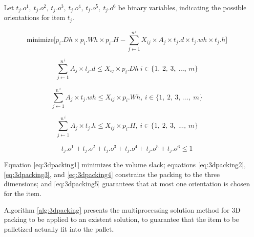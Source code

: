 \documentclass[preprint,authoryear]{elsarticle}
\begin{document}
Let $t_j.o^1,\ t_j.o^2,\ t_j.o^3,\ t_j.o^4,\ t_j.o^5,\ t_j.o^6$ be binary variables, indicating the possible orientations for item $t_j$.


\begin{equation} \label{eq:3dpacking1}
	\mbox{minimize} \Big [ p_i.Dh \times p_i.Wh \times p_i.H - \sum_{j \gets 1}^{n^{\ i}} X_{ij} \times A_{j} \times t_j.d \times t_j.wh \times t_j.h \Big ]
\end{equation}

\begin{equation} \label{eq:3dpacking2}
	\sum_{j \gets 1}^{n^{\ i}} A_{j} \times t_j.d  \leq X_{ij} \times p_i.Dh\ i \in \{1,\ 2,\ 3,\ ...,\ m\}
\end{equation}

\begin{equation} \label{eq:3dpacking3}
	\sum_{j \gets 1}^{n^{\ i}} A_{j} \times t_j.wh  \leq X_{ij} \times p_i.Wh,\ i \in \{1,\ 2,\ 3,\ ...,\ m\}
\end{equation}

\begin{equation} \label{eq:3dpacking4}
	\sum_{j \gets 1}^{n^{\ i}} A_{j} \times t_j.h  \leq X_{ij} \times p_i.H,\ i \in \{1,\ 2,\ 3,\ ...,\ m\}
\end{equation}

\begin{equation} \label{eq:3dpacking5}
t_j.o^1 + t_j.o^2 + t_j.o^3 + t_j.o^4 + t_j.o^5 + t_j.o^6 \leq 1
\end{equation}

Equation \ref{eq:3dpacking1} minimizes the volume slack; equations \ref{eq:3dpacking2}, \ref{eq:3dpacking3}, and \ref{eq:3dpacking4} constrains the packing to the three dimensions; and \ref{eq:3dpacking5} guarantees that at most one orientation is chosen for the item.

Algorithm \ref{alg:3dpacking} presents the multiprocessing solution method for 3D packing to be applied to an existent solution, to guarantee that the item to be palletized actually fit into the pallet.
\end{document}
